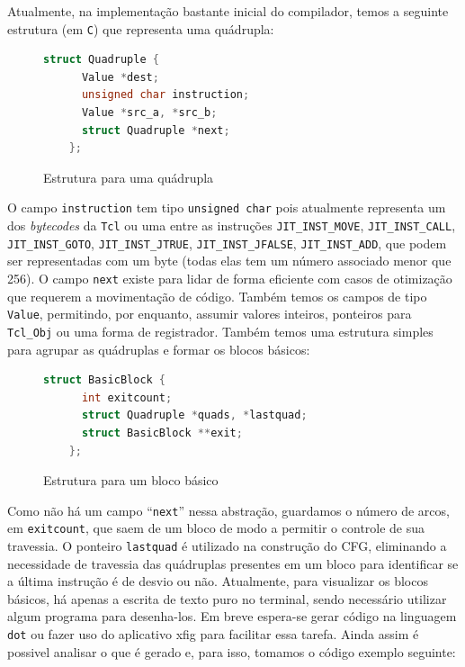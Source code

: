 Atualmente, na implementação bastante inicial do compilador, temos a
seguinte estrutura (em \texttt{C}) que representa uma quádrupla:

\begin{figure}[h]
  \centering
  \begin{lstlisting}[language=C]
    struct Quadruple {
      Value *dest;
      unsigned char instruction;
      Value *src_a, *src_b;
      struct Quadruple *next;
    };
  \end{lstlisting}
  \caption{Estrutura para uma quádrupla}
\end{figure}

O campo \verb!instruction! tem tipo \verb!unsigned char! pois atualmente
representa um dos \textit{bytecodes} da \texttt{Tcl} ou uma entre as
instruções \verb!JIT_INST_MOVE!, \verb!JIT_INST_CALL!,\\
\verb!JIT_INST_GOTO!, \verb!JIT_INST_JTRUE!, \verb!JIT_INST_JFALSE!,
\verb!JIT_INST_ADD!, que podem ser representadas com um
byte (todas elas tem um número associado menor que 256).
O campo \verb!next! existe para
lidar de forma eficiente com casos de otimização que requerem a
movimentação de código. Também temos os campos de tipo \verb!Value!,
permitindo, por enquanto, assumir valores inteiros, ponteiros para
\verb!Tcl_Obj! ou uma forma de registrador. Também temos uma estrutura
simples para agrupar as quádruplas e formar os blocos básicos:

\begin{figure}[h]
  \centering
  \begin{lstlisting}[language=C]
    struct BasicBlock {
      int exitcount;
      struct Quadruple *quads, *lastquad;
      struct BasicBlock **exit;
    };
  \end{lstlisting}
  \caption{Estrutura para um bloco básico}
\end{figure}

Como não há um campo ``\verb!next!'' nessa abstração, guardamos o
número de arcos, em \verb!exitcount!, que saem de um bloco de modo a
permitir o controle de sua travessia. O ponteiro \verb!lastquad! é
utilizado na construção do CFG, eliminando a necessidade de travessia das
quádruplas presentes em um bloco para identificar se a última
instrução é de desvio ou não. Atualmente, para visualizar os blocos básicos,
há apenas a escrita de texto puro no terminal, sendo
necessário utilizar algum programa para desenha-los. Em breve
espera-se gerar código na linguagem \texttt{dot} ou fazer uso do
aplicativo xfig para facilitar essa tarefa. Ainda assim é possivel
analisar o que é gerado e, para isso, tomamos o código exemplo seguinte:

